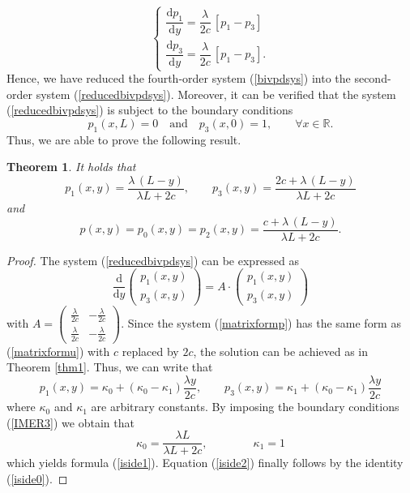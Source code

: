 \documentclass{article}
\newtheorem{thm}{Theorem}
\begin{document}
\begin{equation}\label{reducedbivpdsys}
\begin{cases}
\dfrac{\mathrm{d} p_1}{\mathrm{d} y}=\dfrac{\lambda}{2c}\,\left[p_1-p_3\right]\\[0.75em]
\dfrac{\mathrm{d} p_3}{\mathrm{d} y}=\dfrac{\lambda}{2c}\,\left[p_1-p_3\right].
\end{cases}\end{equation}
Hence, we have reduced the fourth-order system (\ref{bivpdsys}) into the second-order system (\ref{reducedbivpdsys}). Moreover, it can be verified that the system (\ref{reducedbivpdsys}) is subject to the boundary conditions
\begin{equation}p_1(x,L)=0\quad\text{and}\quad p_3(x,0)=1,\qquad \forall x\in\mathbb{R}.\label{IMER3}\end{equation}
Thus, we are able to prove the following result.
\begin{thm}\label{thm:p}It holds that
\begin{equation}p_1(x,y)=\frac{\lambda\,(L-y)}{\lambda L+2c},\qquad p_3(x,y)=\frac{2c+\lambda\,(L-y)}{\lambda L+2c}\label{iside1}\end{equation}
and
\begin{equation}p(x,y)=p_0(x,y)=p_2(x,y)=\frac{c+\lambda\,(L-y)}{\lambda L+2c}.\label{iside2}\end{equation}\end{thm}
\begin{proof}
The system (\ref{reducedbivpdsys}) can be expressed as
\begin{equation}\frac{\mathrm{d}}{\mathrm{d} y}\begin{pmatrix}p_1(x,y)\\p_3(x,y)\end{pmatrix}=A\cdot\begin{pmatrix}p_1(x,y)\\p_3(x,y)\end{pmatrix}\label{matrixformp}\end{equation} with $A=\begin{pmatrix}\frac{\lambda}{2c} & -\frac{\lambda}{2c}\\[0.5em]\frac{\lambda}{2c} & -\frac{\lambda}{2c}\end{pmatrix}.$
Since the system (\ref{matrixformp}) has the same form as (\ref{matrixformu}) with $c$ replaced by $2c$, the solution can be achieved as in Theorem \ref{thm1}. Thus, we can write that
$$p_1(x,y)=\kappa_0+(\kappa_0-\kappa_1)\frac{\lambda y}{2c},\qquad p_3(x,y)=\kappa_1+(\kappa_0-\kappa_1)\frac{\lambda y}{2c}$$ where $\kappa_0$ and $\kappa_1$ are arbitrary constants. By imposing the boundary conditions (\ref{IMER3}) we obtain that
$$\kappa_0=\frac{\lambda L}{\lambda L+2c},\qquad\qquad\kappa_1=1$$ which yields formula (\ref{iside1}). Equation (\ref{iside2}) finally follows by the identity (\ref{iside0}).
\end{proof}
\end{document}
